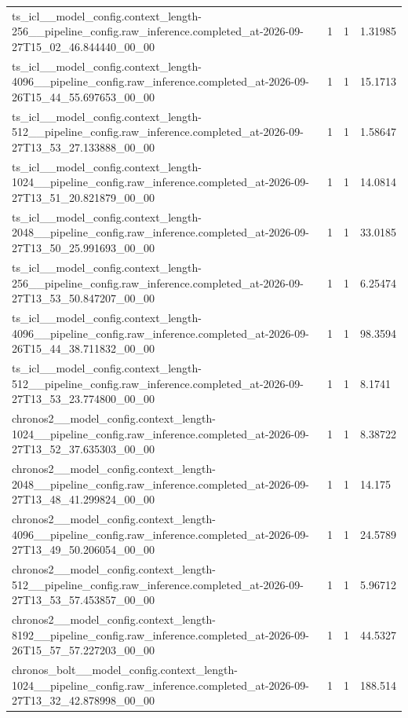 \begin{tabular}{llll}
ts\_icl\_\_model\_config.context\_length-256\_\_pipeline\_config.raw\_inference.completed\_at-2026-09-27T15\_02\_46.844440\_00\_00 & 1 & 1 & 1.31985 \\
ts\_icl\_\_model\_config.context\_length-4096\_\_pipeline\_config.raw\_inference.completed\_at-2026-09-26T15\_44\_55.697653\_00\_00 & 1 & 1 & 15.1713 \\
ts\_icl\_\_model\_config.context\_length-512\_\_pipeline\_config.raw\_inference.completed\_at-2026-09-27T13\_53\_27.133888\_00\_00 & 1 & 1 & 1.58647 \\
ts\_icl\_\_model\_config.context\_length-1024\_\_pipeline\_config.raw\_inference.completed\_at-2026-09-27T13\_51\_20.821879\_00\_00 & 1 & 1 & 14.0814 \\
ts\_icl\_\_model\_config.context\_length-2048\_\_pipeline\_config.raw\_inference.completed\_at-2026-09-27T13\_50\_25.991693\_00\_00 & 1 & 1 & 33.0185 \\
ts\_icl\_\_model\_config.context\_length-256\_\_pipeline\_config.raw\_inference.completed\_at-2026-09-27T13\_53\_50.847207\_00\_00 & 1 & 1 & 6.25474 \\
ts\_icl\_\_model\_config.context\_length-4096\_\_pipeline\_config.raw\_inference.completed\_at-2026-09-26T15\_44\_38.711832\_00\_00 & 1 & 1 & 98.3594 \\
ts\_icl\_\_model\_config.context\_length-512\_\_pipeline\_config.raw\_inference.completed\_at-2026-09-27T13\_53\_23.774800\_00\_00 & 1 & 1 & 8.1741 \\
chronos2\_\_model\_config.context\_length-1024\_\_pipeline\_config.raw\_inference.completed\_at-2026-09-27T13\_52\_37.635303\_00\_00 & 1 & 1 & 8.38722 \\
chronos2\_\_model\_config.context\_length-2048\_\_pipeline\_config.raw\_inference.completed\_at-2026-09-27T13\_48\_41.299824\_00\_00 & 1 & 1 & 14.175 \\
chronos2\_\_model\_config.context\_length-4096\_\_pipeline\_config.raw\_inference.completed\_at-2026-09-27T13\_49\_50.206054\_00\_00 & 1 & 1 & 24.5789 \\
chronos2\_\_model\_config.context\_length-512\_\_pipeline\_config.raw\_inference.completed\_at-2026-09-27T13\_53\_57.453857\_00\_00 & 1 & 1 & 5.96712 \\
chronos2\_\_model\_config.context\_length-8192\_\_pipeline\_config.raw\_inference.completed\_at-2026-09-26T15\_57\_57.227203\_00\_00 & 1 & 1 & 44.5327 \\
chronos\_bolt\_\_model\_config.context\_length-1024\_\_pipeline\_config.raw\_inference.completed\_at-2026-09-27T13\_32\_42.878998\_00\_00 & 1 & 1 & 188.514 \\

\end{tabular}

